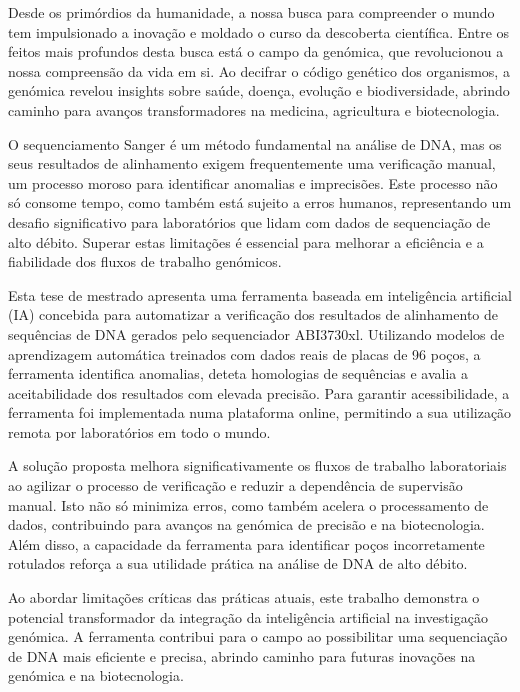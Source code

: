
%

Desde os primórdios da humanidade, a nossa busca para compreender o mundo tem impulsionado a inovação e moldado o curso da descoberta científica. Entre os feitos mais profundos desta busca está o campo da genómica, que revolucionou a nossa compreensão da vida em si. Ao decifrar o código genético dos organismos, a genómica revelou insights sobre saúde, doença, evolução e biodiversidade, abrindo caminho para avanços transformadores na medicina, agricultura e biotecnologia.

O sequenciamento Sanger é um método fundamental na análise de DNA, mas os seus resultados de alinhamento exigem frequentemente uma verificação manual, um processo moroso para identificar anomalias e imprecisões. Este processo não só consome tempo, como também está sujeito a erros humanos, representando um desafio significativo para laboratórios que lidam com dados de sequenciação de alto débito. Superar estas limitações é essencial para melhorar a eficiência e a fiabilidade dos fluxos de trabalho genómicos.

Esta tese de mestrado apresenta uma ferramenta baseada em inteligência artificial (IA) concebida para automatizar a verificação dos resultados de alinhamento de sequências de DNA gerados pelo sequenciador ABI3730xl. Utilizando modelos de aprendizagem automática treinados com dados reais de placas de 96 poços, a ferramenta identifica anomalias, deteta homologias de sequências e avalia a aceitabilidade dos resultados com elevada precisão. Para garantir acessibilidade, a ferramenta foi implementada numa plataforma online, permitindo a sua utilização remota por laboratórios em todo o mundo.

A solução proposta melhora significativamente os fluxos de trabalho laboratoriais ao agilizar o processo de verificação e reduzir a dependência de supervisão manual. Isto não só minimiza erros, como também acelera o processamento de dados, contribuindo para avanços na genómica de precisão e na biotecnologia. Além disso, a capacidade da ferramenta para identificar poços incorretamente rotulados reforça a sua utilidade prática na análise de DNA de alto débito.

Ao abordar limitações críticas das práticas atuais, este trabalho demonstra o potencial transformador da integração da inteligência artificial na investigação genómica. A ferramenta contribui para o campo ao possibilitar uma sequenciação de DNA mais eficiente e precisa, abrindo caminho para futuras inovações na genómica e na biotecnologia.

